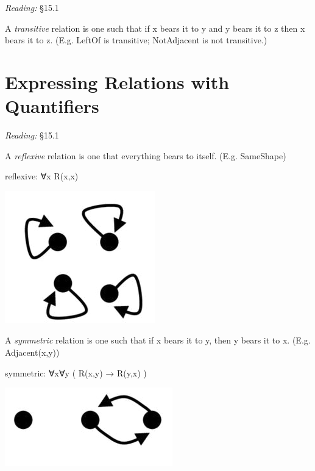 \documentclass[12pt]{extarticle}
\begin{document}
\begin{multicols*}{3}
\emph{Reading:} §15.1
 
A \emph{transitive} relation is one such that if x bears it to y and y bears it to z then x bears it to z. (E.g. LeftOf is transitive; NotAdjacent is not transitive.)
 
 
 
\section{Expressing Relations with Quantifiers}
 
\emph{Reading:} §15.1
 
\begin{minipage}{\columnwidth}
 
A \emph{reflexive} relation is one that everything bears to itself. (E.g. SameShape)
 
reflexive: ∀x R(x,x)
 
\begin{center}
\includegraphics[scale=0.3]{img/reflexive.png}
\end{center}
\end{minipage}
 
\begin{minipage}{\columnwidth}
 
A \emph{symmetric} relation is one such that if x bears it to y, then y bears it to x. (E.g. Adjacent(x,y))
 
symmetric: ∀x∀y ( R(x,y) → R(y,x) )
 
\begin{center}
\includegraphics[scale=0.3]{img/symmetric.png}
\end{center}
\end{minipage}
 

\end{multicols*}
\end{document}
